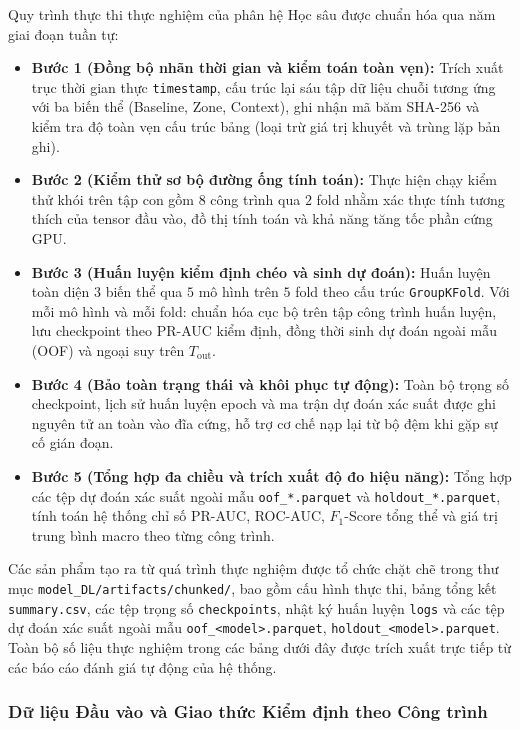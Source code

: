 Quy trình thực thi thực nghiệm của phân hệ Học sâu được chuẩn hóa qua năm giai đoạn tuần tự:
\begin{itemize}
    \item \textbf{Bước 1 (Đồng bộ nhãn thời gian và kiểm toán toàn vẹn):} Trích xuất trục thời gian thực \texttt{timestamp}, cấu trúc lại sáu tập dữ liệu chuỗi tương ứng với ba biến thể (Baseline, Zone, Context), ghi nhận mã băm SHA-256 và kiểm tra độ toàn vẹn cấu trúc bảng (loại trừ giá trị khuyết và trùng lặp bản ghi).
    \item \textbf{Bước 2 (Kiểm thử sơ bộ đường ống tính toán):} Thực hiện chạy kiểm thử khói trên tập con gồm $8$ công trình qua $2$ fold nhằm xác thực tính tương thích của tensor đầu vào, đồ thị tính toán và khả năng tăng tốc phần cứng GPU.
    \item \textbf{Bước 3 (Huấn luyện kiểm định chéo và sinh dự đoán):} Huấn luyện toàn diện $3$ biến thể qua $5$ mô hình trên $5$ fold theo cấu trúc \texttt{GroupKFold}. Với mỗi mô hình và mỗi fold: chuẩn hóa cục bộ trên tập công trình huấn luyện, lưu checkpoint theo PR-AUC kiểm định, đồng thời sinh dự đoán ngoài mẫu (OOF) và ngoại suy trên $T_{\text{out}}$.
    \item \textbf{Bước 4 (Bảo toàn trạng thái và khôi phục tự động):} Toàn bộ trọng số checkpoint, lịch sử huấn luyện epoch và ma trận dự đoán xác suất được ghi nguyên tử an toàn vào đĩa cứng, hỗ trợ cơ chế nạp lại từ bộ đệm khi gặp sự cố gián đoạn.
    \item \textbf{Bước 5 (Tổng hợp đa chiều và trích xuất độ đo hiệu năng):} Tổng hợp các tệp dự đoán xác suất ngoài mẫu \texttt{oof\_*.parquet} và \texttt{holdout\_*.parquet}, tính toán hệ thống chỉ số PR-AUC, ROC-AUC, $F_1$-Score tổng thể và giá trị trung bình macro theo từng công trình.
\end{itemize}
Các sản phẩm tạo ra từ quá trình thực nghiệm được tổ chức chặt chẽ trong thư mục \texttt{model\_DL/artifacts/chunked/}, bao gồm cấu hình thực thi, bảng tổng kết \texttt{summary.csv}, các tệp trọng số \texttt{checkpoints}, nhật ký huấn luyện \texttt{logs} và các tệp dự đoán xác suất ngoài mẫu \texttt{oof\_<model>.parquet}, \texttt{holdout\_<model>.parquet}. Toàn bộ số liệu thực nghiệm trong các bảng dưới đây được trích xuất trực tiếp từ các báo cáo đánh giá tự động của hệ thống.

\subsubsection{Dữ liệu Đầu vào và Giao thức Kiểm định theo Công trình}

